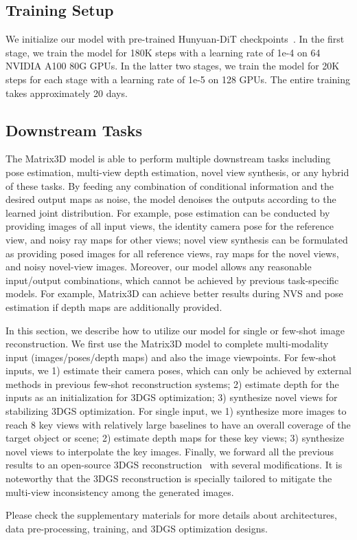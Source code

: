 \subsection{Training Setup}
\label{sec:3.4}
We initialize our model with pre-trained Hunyuan-DiT checkpoints~\cite{li2024hunyuan}. 
In the first stage, we train the model for 180K steps with a learning rate of 1e-4 on 64 NVIDIA A100 80G GPUs. In the latter two stages, we train the model for 20K steps for each stage with a learning rate of 1e-5 on 128 GPUs. 
The entire training takes approximately 20 days.


\subsection{Downstream Tasks}
\label{sec:3.5}

The Matrix3D model is able to perform multiple downstream tasks including pose estimation, multi-view depth estimation, novel view synthesis, or any hybrid of these tasks. By feeding any combination of conditional information and the desired output maps as noise, the model denoises the outputs according to the learned joint distribution. For example, pose estimation can be conducted by providing images of all input views, the identity camera pose for the reference view, and noisy ray maps for other views; novel view synthesis can be formulated as providing posed images for all reference views, ray maps for the novel views, and noisy novel-view images. 
Moreover, our model allows any reasonable input/output combinations, which cannot be achieved by previous task-specific models. For example, Matrix3D can achieve better results during NVS and pose estimation if depth maps are additionally provided. 

In this section, we describe how to utilize our model for single or few-shot image reconstruction. We first use the Matrix3D model to complete multi-modality input (images/poses/depth maps) and also the image viewpoints. 
For few-shot inputs, we 1) estimate their camera poses, which can only be achieved by external methods in previous few-shot reconstruction systems; 2) estimate depth for the inputs as an initialization for 3DGS optimization; 3) synthesize novel views for stabilizing 3DGS optimization. 
For single input, we 1) synthesize more images to reach 8 key views with relatively large baselines to have an overall coverage of the target object or scene; 2) estimate depth maps for these key views; 3) synthesize novel views to interpolate the key images. 
Finally, we forward all the previous results to an open-source 3DGS reconstruction~\cite{nerfstudio} with several modifications. It is noteworthy that the 3DGS reconstruction is specially tailored to mitigate the multi-view inconsistency among the generated images. 

Please check the supplementary materials for more details about architectures, data pre-processing, training, and 3DGS optimization designs.
